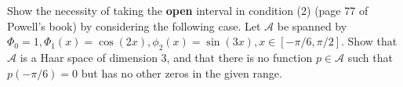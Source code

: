 \begin{problem}
Show the necessity of taking the \textbf{open} interval in condition (2) (page 77 of Powell's book) by considering the following case. Let $\mathcal{A}$ be spanned by $\Phi_0 = 1, \Phi_1(x) = \cos(2x), \phi_2(x) = \sin(3x), x \in [-\pi/6,\pi/2]$. Show that $\mathcal{A}$ is a Haar space of dimension 3, and that there is no function $p \in \mathcal{A}$ such that $p(-\pi/6) = 0$ but has no other zeros in the given range.
\end{problem}

\begin{solution}

\end{solution}